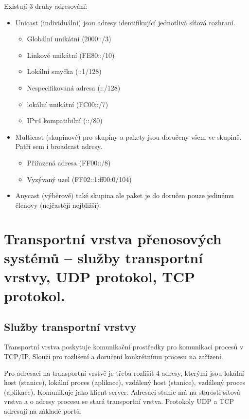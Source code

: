 Existují 3 druhy adresování:
\begin{itemize}[noitemsep]
    \item Unicast (individuální) jsou adresy identifikující jednotlivá síťová rozhraní.
    \begin{itemize}[noitemsep]
        \item Globální unikátní (2000::/3)
        \item Linkové unikátní (FE80::/10)
        \item Lokální smyčka (::1/128)
        \item Nespecifikovaná adresa (::/128)
        \item lokální unikátní (FC00::/7)
        \item IPv4 kompatibilní (::/80)
    \end{itemize}
    \item Multicast (skupinové) pro skupiny a pakety jsou doručeny všem ve skupině. Patří sem i broadcast adresy.
    \begin{itemize}[noitemsep]
        \item Přiřazená adresa (FF00::/8)
        \item Vyzývaný uzel (FF02::1:ff00:0/104)
    \end{itemize}
    \item Anycast (výběrové) také skupina ale paket je do doručen pouze jedinému členovy (nejčastěji nejbližší).
\end{itemize}

\clearpage
\section{Transportní vrstva přenosových systémů -- služby transportní vrstvy, UDP protokol, TCP protokol.}

\subsection{Služby transportní vrstvy}

Transportní vrstva poskytuje komunikační prostředky pro komunikaci procesů v TCP/IP. Slouží pro rozlišení a doručení konkrétnímu procesu na zařízení.

Pro adresaci na transportní vrstvě je třeba rozlišit 4 adresy, kterými jsou lokální host (stanice), lokální proces (aplikace), vzdálený host (stanice), vzdálený proces (aplikace). Komunikuje jako klient-server. Adresaci stanic má na starosti síťová vrstva a o adresy procesu se stará transportní vrstva. Protokoly UDP a TCP adresují na základě portů.

